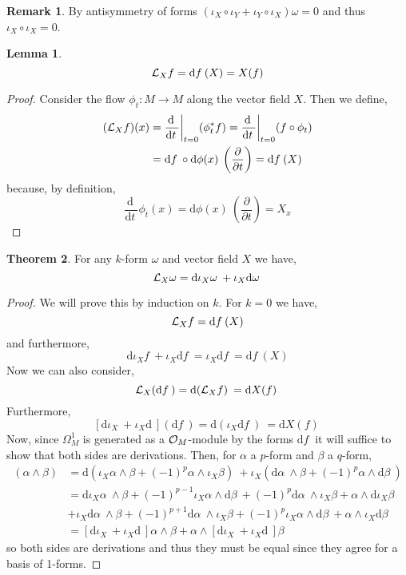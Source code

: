 \documentclass[12pt]{extarticle}
\renewcommand{\d}[1]{ \mathrm{d}#1 \:}
\newcommand{\deriv}[2]{\frac{\d{#1}}{\d{#2}}}
\newcommand{\pderiv}[2]{\frac{\partial{#1}}{\partial{#2}}}
\theoremstyle{definition}
\newtheorem{theorem}{Theorem}[section]
\newtheorem{lemma}[theorem]{Lemma}
\newtheorem{remark}{Remark}
\begin{document}
\begin{remark}
By antisymmetry of forms $(\iota_X \circ \iota_Y + \iota_Y \circ \iota_X) \omega = 0$ and thus $\iota_X \circ \iota_X = 0$. 
\end{remark}

\begin{lemma}
\[ \L_X f = \d{f}(X) = X(f) \]
\end{lemma}

\begin{proof}
Consider the flow $\phi_t : M \to M$ along the vector field $X$. Then we define,
\begin{align*}
(\L_X f)(x) & = \deriv{}{t} \bigg|_{t = 0} (\phi_t^* f) = \deriv{}{t} \bigg|_{t = 0} (f \circ \phi_t)
\\
& = \d{f} \circ \d{\phi(x)} \left( \pderiv{}{t} \right) = \d{f} (X) 
\end{align*}
because, by definition,
\[ \deriv{}{t} \phi_t(x) = \d{\phi(x)} \left( \pderiv{}{t} \right) = X_x \]
\end{proof}

\begin{theorem}
For any $k$-form $\omega$ and vector field $X$ we have,
\[ \L_X \omega = \d{\iota_X \omega}  + \iota_X \d{\omega} \]
\end{theorem}

\begin{proof}
We will prove this by induction on $k$. For $k = 0$ we have,
\[ \L_X f = \d{f}(X) \]
and furthermore,
\[ \d{\iota_X f} + \iota_X \d{f} = \iota_X \d{f} = \d{f}(X) \]
Now we can also consider,
\[ \L_X (\d{f}) = \d{(\L_X f)} = \d{ X(f)} \]
Furthermore,
\[ [\d{\iota_X} + \iota_X \d{} ](\d{f}) = \d{(\iota_X \d{f})} = \d{X(f)} \] 
Now, since $\Omega^1_M$ is generated as a $\mathcal{O}_{M}$-module by the forms $\d{f}$ it will suffice to show that both sides are derivations. Then, for $\alpha$ a $p$-form and $\beta$ a $q$-form,
\begin{align*}
[\d{\iota_X} + \iota_X \d{} ](\alpha \wedge \beta) & = \d{\left( \iota_X \alpha \wedge \beta + (-1)^p \alpha \wedge \iota_X \beta \right)} + \iota_X {\left( \d{\alpha} \wedge \beta + (-1)^p \alpha \wedge \d{\beta} \right)}
\\
& = \d{\iota_X \alpha} \wedge \beta + (-1)^{p-1} \iota_X \alpha \wedge \d{\beta} + (-1)^p \d{\alpha} \wedge \iota_X \beta + \alpha \wedge \d{\iota_X \beta} 
\\
& + \iota_X \d{\alpha} \wedge \beta + (-1)^{p+1} \d{\alpha} \wedge \iota_X \beta + (-1)^p \iota_X \alpha \wedge \d{\beta} + \alpha \wedge \iota_X \d{\beta}
\\
& = [ \d{\iota_X} + \iota_X \d{} ] \alpha \wedge \beta + \alpha \wedge [ \d{\iota_X} + \iota_X \d{} ]  \beta 
\end{align*}
so both sides are derivations and thus they must be equal since they agree for a basis of 1-forms. 
\end{proof}
\end{document}
